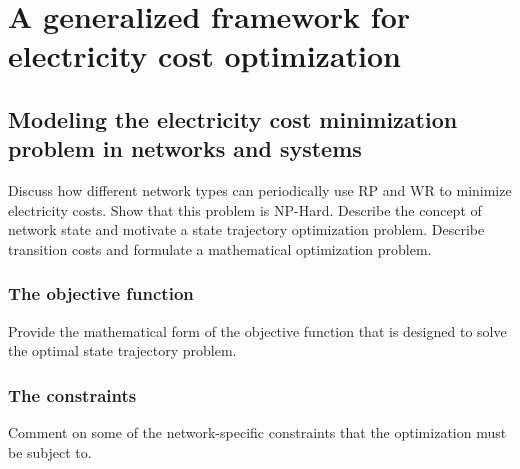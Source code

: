 \chapter{A generalized framework for electricity cost optimization}
\label{chap:framework}

\section{Modeling the electricity cost minimization problem in networks and systems} Discuss how different network types can periodically use RP and WR to minimize electricity costs. Show that this problem is NP-Hard. Describe the concept of network state and motivate a state trajectory optimization problem. Describe transition costs and formulate a mathematical optimization problem. 
\subsection{The objective function} Provide the mathematical form of the objective function that is designed to solve the optimal state trajectory problem.
\subsection{The constraints} Comment on some of the network-specific constraints that the optimization must be subject to.

